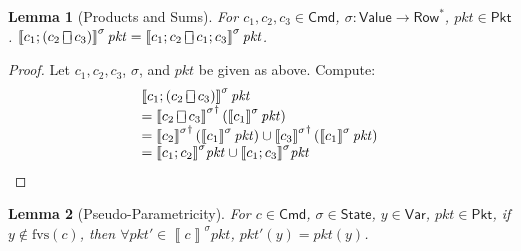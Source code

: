 \documentclass{article}
\newcommand{\pkt}{\mathit{pkt}}
\newcommand{\denote}[1]{\left\llbracket#1\right\rrbracket}
\newcommand{\Value}{\mathsf{Value}}
\newcommand{\Cmd}{\mathsf{Cmd}}
\newcommand{\Pkt}{\mathsf{Pkt}}
\newcommand{\Row}{\mathsf{Row}}
\newcommand{\Var}{\mathsf{Var}}
\newcommand{\State}{\mathsf{State}}
\newcommand{\choiceop}{\rotatebox[origin=c]{90}{$\sqsubset\!\!\!\sqsupset$}}
\newcommand{\choice}{\mathbin{\choiceop}}
\newcommand{\fvs}{\textrm{fvs}}
\theoremstyle{plain}
\newtheorem{lemma}{Lemma}
\theoremstyle{definition}
\theoremstyle{remark}
\begin{document}
\begin{lemma}[Products and Sums]
  \label{lem:prod-sum}
  For $c_1,c_2, c_3 \in \Cmd$, $\sigma : \Value \to \Row^*$, $\pkt \in \Pkt$.
  $\denote{c_1;(c_2 \choice c_3)}^\sigma\pkt = \denote{c_1;c_2 \choice
    c_1;c_3}^\sigma\pkt$.
\end{lemma}
\begin{proof}
  Let $c_1,c_2,c_3$, $\sigma$, and $\pkt$ be given as above. Compute:
  \[
  \begin{array}{ll}
  \denote{c_1;(c_2 \choice c_3)}^\sigma \pkt \\
  = {\denote{c_2 \choice c_3}^\sigma}^\dagger\left(\denote{c_1}^\sigma\pkt\right) \\
  = {\denote{c_2}^\sigma}^\dagger\left(\denote{c_1}^\sigma \pkt\right)
  \cup {\denote{c_3}^\sigma}^\dagger\left(\denote{c_1}^\sigma \pkt\right) \\
  = {\denote{c_1;c_2}^\sigma}\pkt\cup {\denote{c_1;c_3}^\sigma}\pkt
  \end{array}
  \]
\end{proof}





\begin{lemma}[Pseudo-Parametricity]
  \label{lem:parametricity}
  For $c \in \Cmd$, $\sigma \in \State$, $y \in \Var$, $\pkt \in \Pkt$, if $y
  \not\in \fvs(c)$, then $\forall \pkt' \in \denote{c}^\sigma \pkt$, $\pkt'(y) =
  \pkt(y)$.
\end{lemma}
\end{document}
